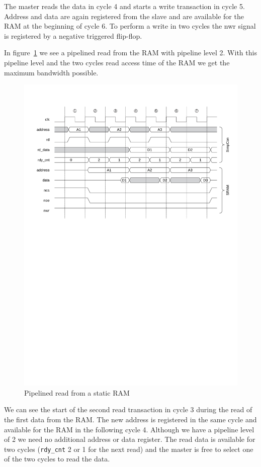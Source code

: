 \documentclass[a4paper,12pt]{scrartcl}
\newcommand{\sign}[1]{{\texttt{#1}}}
\begin{document}
The master reads the data in cycle 4 and starts a write transaction
in cycle 5. Address and data are again registered from the slave and
are available for the RAM at the beginning of cycle 6. To perform a
write in two cycles the nwr signal is registered by a negative
triggered flip-flop.

In figure~\ref{fig:sc:sram:prd} we see a pipelined read from the RAM
with pipeline level 2. With this pipeline level and the two cycles
read access time of the RAM we get the maximum bandwidth possible.

\begin{figure}
    \centering
    \includegraphics[width=\textwidth]{figures/sc_sram_prd}
    \caption{Pipelined read from a static RAM}
    \label{fig:sc:sram:prd}
\end{figure}

We can see the start of the second read transaction in cycle 3
during the read of the first data from the RAM. The new address is
registered in the same cycle and available for the RAM in the
following cycle 4. Although we have a pipeline level of 2 we need no
additional address or data register. The read data is available for
two cycles (\sign{rdy\_cnt} 2 or 1 for the next read) and the master
is free to select one of the two cycles to read the data.
\end{document}
